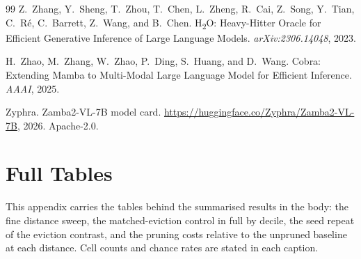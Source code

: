 \begin{thebibliography}{99}
Z.~Zhang, Y.~Sheng, T.~Zhou, T.~Chen, L.~Zheng, R.~Cai, Z.~Song, Y.~Tian,
C.~R\'e, C.~Barrett, Z.~Wang, and B.~Chen.
\newblock H\textsubscript{2}O: Heavy-Hitter Oracle for Efficient Generative
Inference of Large Language Models. \emph{arXiv:2306.14048}, 2023.

H.~Zhao, M.~Zhang, W.~Zhao, P.~Ding, S.~Huang, and D.~Wang.
\newblock Cobra: Extending Mamba to Multi-Modal Large Language Model for
Efficient Inference. \emph{AAAI}, 2025.

Zyphra.
\newblock Zamba2-VL-7B model card.
\newblock \url{https://huggingface.co/Zyphra/Zamba2-VL-7B}, 2026. Apache-2.0.

\end{thebibliography}

\appendix

\section{Full Tables}
\label{app:tables}

This appendix carries the tables behind the summarised results in the body: the
fine distance sweep, the matched-eviction control in full by decile, the seed
repeat of the eviction contrast, and the pruning costs relative to the unpruned
baseline at each distance. Cell counts and chance rates are stated in each
caption.

